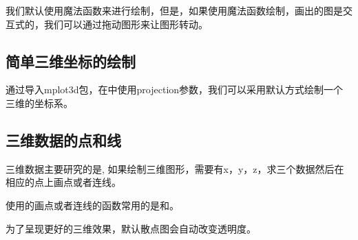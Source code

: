\documentclass[letterpaper,10pt,english]{sphinxhowto}
\begin{document}
我们默认使用魔法函数来进行绘制，但是，如果使用魔法函数绘制，画出的图是交互式的，我们可以通过拖动图形来让图形转动。


\subsection{简单三维坐标的绘制}
\label{\detokenize{_u4e09_u7ef4_u56fe:id2}}
通过导入mplot3d包，在中使用projection参数，我们可以采用默认方式绘制一个三维的坐标系。

%
\begin{sphinxVerbatim}[commandchars=\\\{\}]
 

   
   

   

  
  

\end{sphinxVerbatim}



\subsection{三维数据的点和线}
\label{\detokenize{_u4e09_u7ef4_u56fe:id3}}
三维数据主要研究的是, 如果绘制三维图形，需要有x，y，z，求三个数据然后在相应的点上画点或者连线。

使用的画点或者连线的函数常用的是和。

为了呈现更好的三维效果，默认散点图会自动改变透明度。
\end{document}

